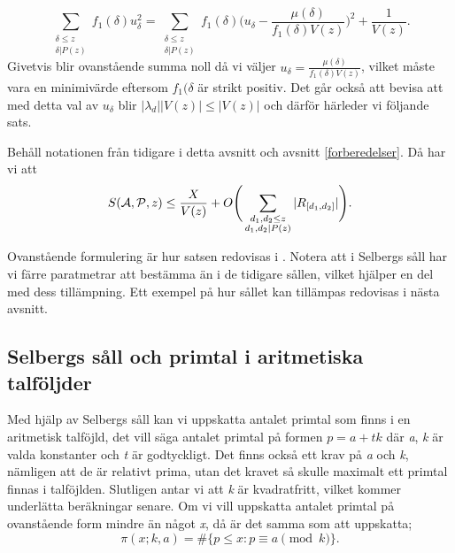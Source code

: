 \begin{equation}
    \sum_{\substack{\delta \leq z\\ \delta | P(z)}}f_1(\delta) u_\delta^2 = \sum_{\substack{\delta\leq z\\\delta|P(z)}}f_1(\delta)\Bigg(u_\delta - \frac{\mu(\delta)}{f_1(\delta)V(z)}\Bigg)^2 + \frac{1}{V(z)}.\nonumber
\end{equation}
Givetvis blir ovanstående summa noll då vi väljer \(u_\delta = \frac{\mu(\delta)}{f_1(\delta)V(z)}\), vilket måste vara en minimivärde eftersom \(f_1(\delta\) är strikt positiv.
Det går också att bevisa att med detta val av \(u_\delta\) blir \(|\lambda_d||V(z)| \leq |V(z)|\) \cite[s. 122-123]{cojocarumurty} och därför härleder vi följande sats.
\begin{theorem}\label{sel.sieve.thm}
Behåll notationen från tidigare i detta avsnitt och avsnitt \ref{forberedelser}. Då har vi att
\begin{equation}
    S(\mathcal{A}, \mathcal{P}, z) \leq \frac{X}{V(z)} + O\Bigg(\sum_{\substack{d_1,d_2\leq z\\d_1,d_2\mid P(z)}}|R_{[d_1, d_2]}|\Bigg).\nonumber
\end{equation}
\end{theorem}
Ovanstående formulering är hur satsen redovisas i \cite[sats 7.2.1]{cojocarumurty}.
Notera att i Selbergs såll har vi färre paratmetrar att bestämma än i de tidigare sållen, vilket hjälper en del med dess tillämpning. 
Ett exempel på hur sållet kan tillämpas redovisas i nästa avsnitt.

\subsection{Selbergs såll och primtal i aritmetiska talföljder}\label{sel.apl}

Med hjälp av Selbergs såll kan vi uppskatta antalet primtal som finns i en aritmetisk talföjld, det vill säga antalet primtal på formen \(p = a + tk\) där \textit{a}, \textit{k} är valda konstanter och \textit{t} är godtyckligt. 
Det finns också ett krav på \textit{a} och \textit{k}, nämligen att de är relativt prima, utan det kravet så skulle maximalt ett primtal finnas i talföjlden. 
Slutligen antar vi att \textit{k} är kvadratfritt, vilket kommer underlätta beräkningar senare.
Om vi vill uppskatta antalet primtal på ovanstående form mindre än något \textit{x}, då är det samma som att uppskatta;
\begin{equation}
    \pi(x;k,a) = \#\{p\leq x: p \equiv a \pmod{k}\}.\label{sel.apl.arithPrimes}
\end{equation}

